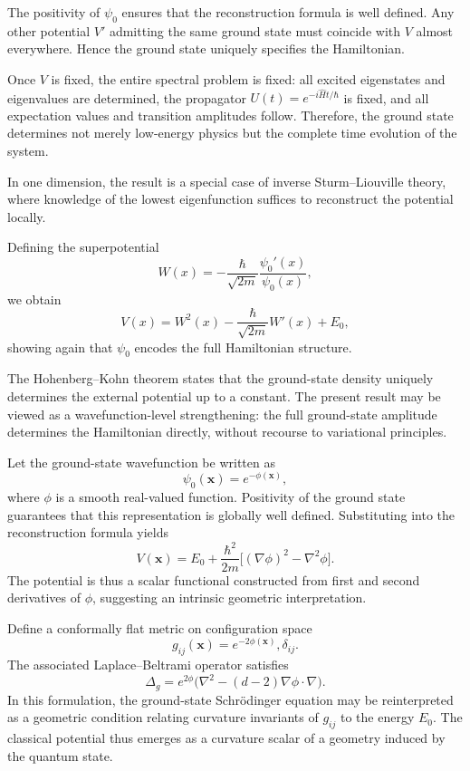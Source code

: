 The positivity of $\psi_0$ ensures that the reconstruction formula is well defined. Any other potential $V'$ admitting the same ground state must coincide with $V$ almost everywhere. Hence the ground state uniquely specifies the Hamiltonian.

Once $V$ is fixed, the entire spectral problem is fixed: all excited eigenstates and eigenvalues are determined, the propagator $U(t)=e^{-i\hat H t/\hbar}$ is fixed, and all expectation values and transition amplitudes follow. Therefore, the ground state determines not merely low-energy physics but the complete time evolution of the system.

In one dimension, the result is a special case of inverse Sturm--Liouville theory, where knowledge of the lowest eigenfunction suffices to reconstruct the potential locally.

Defining the superpotential
\begin{equation}
W(x) = -\frac{\hbar}{\sqrt{2m}}\frac{\psi_0'(x)}{\psi_0(x)},
\end{equation}
we obtain
\begin{equation}
V(x) = W^2(x) - \frac{\hbar}{\sqrt{2m}}W'(x) + E_0,
\end{equation}
showing again that $\psi_0$ encodes the full Hamiltonian structure.

The Hohenberg--Kohn theorem states that the ground-state density uniquely determines the external potential up to a constant. The present result may be viewed as a wavefunction-level strengthening: the full ground-state amplitude determines the Hamiltonian directly, without recourse to variational principles.

Let the ground-state wavefunction be written as
\begin{equation}
\psi_0(\mathbf{x}) = e^{-\phi(\mathbf{x})},
\end{equation}
where $\phi$ is a smooth real-valued function. Positivity of the ground state guarantees that this representation is globally well defined. Substituting into the reconstruction formula yields
\begin{equation}
V(\mathbf{x}) = E_0 + \frac{\hbar^2}{2m}\Big[(\nabla \phi)^2 - \nabla^2 \phi\Big].
\end{equation}
The potential is thus a scalar functional constructed from first and second derivatives of $\phi$, suggesting an intrinsic geometric interpretation.

Define a conformally flat metric on configuration space
\begin{equation}
g_{ij}(\mathbf{x}) = e^{-2\phi(\mathbf{x})},\delta_{ij}.
\end{equation}
The associated Laplace--Beltrami operator satisfies
\begin{equation}
\Delta_g = e^{2\phi}\bigl(\nabla^2 - (d-2)\nabla \phi \cdot \nabla\bigr).
\end{equation}
In this formulation, the ground-state Schr\"odinger equation may be reinterpreted as a geometric condition relating curvature invariants of $g_{ij}$ to the energy $E_0$. The classical potential thus emerges as a curvature scalar of a geometry induced by the quantum state.

